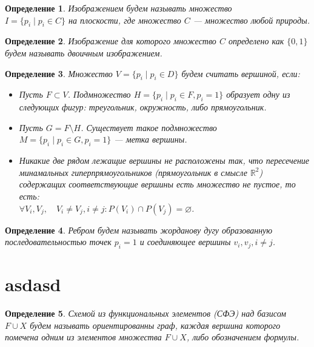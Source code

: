 \documentclass[makeidx, a4paper, 14pt]{extarticle}
\newcommand{\R}{\mathbb{R}}
\newtheorem{definition}{Определение}
\begin{document}
\begin{definition}
    Изображением будем называть множество \\ ${I = \{p_i \mid p_i \in C\}}$ на плоскости,
    где множество $C$ --- множество любой природы.
\end{definition}

\begin{definition}
    Изображение для которого множество $C$ определено как ${\{0, 1\}}$ будем называть двоичным изображением.
\end{definition}

\begin{definition}
Множество ${V = \{p_i \mid p_i \in D\}}$ будем считать вершиной, если:
\begin{itemize}
    \item Пусть ${F \subset V}$. Подмножество ${H = \{p_i \mid p_i \in F, p_i=1\}}$ образует одну из следующих фигур: треугольник, окружность, либо прямоугольник.
    \item Пусть ${G = F \setminus H}$. Существует такое подмножество \\
          ${M=\{p_i \mid p_i \in G, p_i=1\}}$ --- метка вершины.
    \item Никакие две рядом лежащие вершины не расположены так,
          что пересечение минамальных гиперпрямоугольников (прямоугольник в смысле $\R^2$)
          содержащих соответствующие вершины есть множество не пустое, то есть: \\
          ${\forall V_i, V_j, \quad V_i \neq V_j, i \neq j: P(V_i) \cap P(V_j) = \varnothing}$.
\end{itemize}
\end{definition}

\begin{definition}
Ребром будем называть жорданову дугу образованную последовательностью точек ${p_i=1}$
и соединяющее вершины ${v_i, v_j, i \neq j}$.
\end{definition}

\section{asdasd}

\begin{definition}
    Схемой из функциональных элементов (СФЭ) над базисом ${F \cup X}$ будем называть ориентированны граф,
    каждая вершина которого помечена одним из элементов множества ${F \cup X}$, либо обозначением формулы.
\end{definition}
\end{document}
